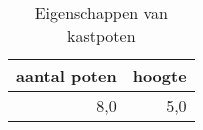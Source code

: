 \begin{table}[h!]
\centering
\caption{Eigenschappen van kastpoten}
\begin{tabular}{rr}
\toprule
 aantal poten &  hoogte \\
\midrule
            8,0 &     5,0 \\
\bottomrule
\end{tabular}
\end{table}

